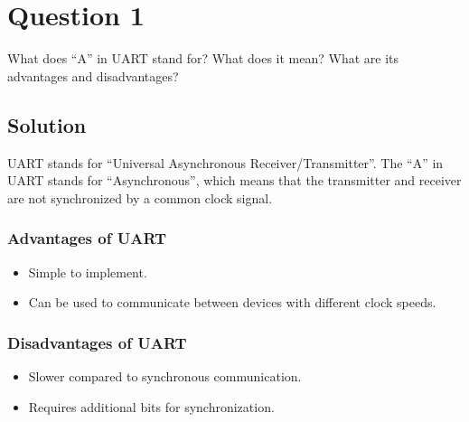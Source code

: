 \section*{Question 1}

What does ``A'' in UART stand for?
What does it mean?
What are its advantages and disadvantages?

\subsection*{Solution}

UART stands for ``Universal Asynchronous Receiver/Transmitter''.
The ``A'' in UART stands for ``Asynchronous'', which means that the transmitter and receiver are not synchronized by a common clock signal.

\subsubsection*{Advantages of UART}
\begin{itemize}[noitemsep]
    \item Simple to implement.
    \item Can be used to communicate between devices with different clock speeds.
\end{itemize}

\subsubsection*{Disadvantages of UART}
\begin{itemize}[noitemsep]
    \item Slower compared to synchronous communication.
    \item Requires additional bits for synchronization.
\end{itemize}

